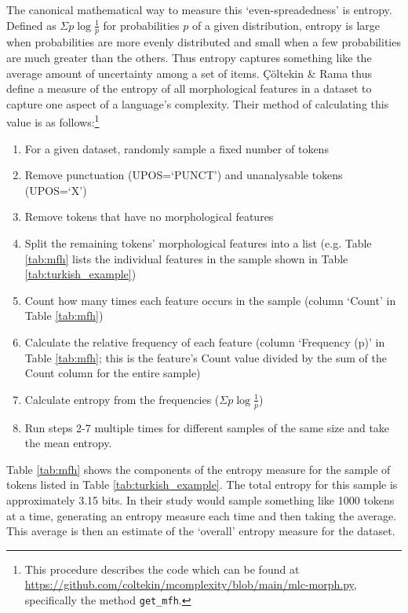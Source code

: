 \documentclass[USenglish]{article}
\begin{document}
The canonical mathematical way to measure this `even-spreadedness' is entropy.
Defined as $\Sigma p \log{\frac{1}{p}}$ for probabilities $p$ of a given distribution, entropy is large when probabilities are more evenly distributed and small when a few probabilities are much greater than the others.
Thus entropy captures something like the average amount of uncertainty among a set of items.
Çöltekin \& Rama thus define a measure of the entropy of all morphological features in a dataset to capture one aspect of a language's complexity.
Their method of calculating this value is as follows:\footnote{This procedure describes the code which can be found at \url{https://github.com/coltekin/mcomplexity/blob/main/mlc-morph.py}, specifically the method \texttt{get\_mfh}.} %
\begin{enumerate}
\item For a given dataset, randomly sample a fixed number of tokens
\item Remove punctuation (UPOS=`PUNCT') and unanalysable tokens (UPOS=`X')
\item Remove tokens that have no morphological features
\item Split the remaining tokens' morphological features into a list (e.g. Table \ref{tab:mfh} lists the individual features in the sample shown in Table \ref{tab:turkish_example})
\item Count how many times each feature occurs in the sample (column `Count' in Table \ref{tab:mfh})
\item Calculate the relative frequency of each feature (column `Frequency (p)' in Table \ref{tab:mfh}; this is the feature's Count value divided by the sum of the Count column for the entire sample)
\item Calculate entropy from the frequencies ($\Sigma p \log{\frac{1}{p}}$)
\item Run steps 2-7 multiple times for different samples of the same size and take the mean entropy.
\end{enumerate}

\noindent Table \ref{tab:mfh} shows the components of the entropy measure for the sample of tokens listed in Table \ref{tab:turkish_example}.
The total entropy for this sample is approximately 3.15 bits.
In their study \citet{ccoltekin2023complexity} would sample something like 1000 tokens at a time, generating an entropy measure each time and then taking the average.
This average is then an estimate of the `overall' entropy measure for the dataset.
\end{document}
